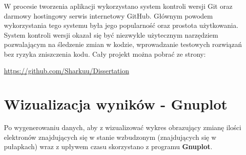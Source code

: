 W procesie tworzenia aplikacji wykorzystano system kontroli wersji Git oraz darmowy hostingowy serwis internetowy GitHub.
Głównym powodem wykorzystania tego systemu była jego popularność oraz prostota użytkowania.
System kontroli wersji okazał się być niezwykle użytecznym narzędziem pozwalającym na
śledzenie zmian w kodzie, wprowadzanie testowych rozwiązań bez
ryzyka zniszczenia kodu. Cały projekt można pobrać ze strony:
\begin{center}
\url{https://github.com/Sharkuu/Dissertation}
\end{center}

\section{Wizualizacja wyników - Gnuplot}

Po wygenerowaniu danych, aby z wizualizować wykres obrazujący zmianę ilości elektronów znajdujących się w stanie wzbudzonym (znajdujących się w pułapkach) wraz z upływem czasu skorzystano z programu \textbf{Gnuplot}.